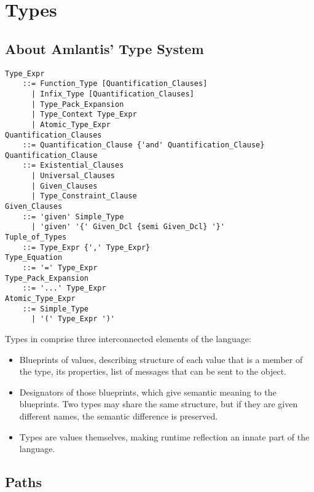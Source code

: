 
\chapter{Types}

\minitoc

\newpage

\section{About Amlantis' Type System}

\grammar\begin{lstlisting}
Type_Expr
    ::= Function_Type [Quantification_Clauses]
      | Infix_Type [Quantification_Clauses]
      | Type_Pack_Expansion
      | Type_Context Type_Expr
      | Atomic_Type_Expr
Quantification_Clauses 
    ::= Quantification_Clause {'and' Quantification_Clause}
Quantification_Clause  
    ::= Existential_Clauses
      | Universal_Clauses
      | Given_Clauses
      | Type_Constraint_Clause
Given_Clauses
    ::= 'given' Simple_Type
      | 'given' '{' Given_Dcl {semi Given_Dcl} '}'
Tuple_of_Types 
    ::= Type_Expr {',' Type_Expr}
Type_Equation 
    ::= '=' Type_Expr
Type_Pack_Expansion 
    ::= '...' Type_Expr
Atomic_Type_Expr
    ::= Simple_Type
      | '(' Type_Expr ')'
\end{lstlisting}

Types in \Aml comprise three interconnected elements of the language:
\begin{itemize}
  \item Blueprints of values, describing structure of each value that is a member of the type, its properties, list of messages that can be sent to the object. 
  \item Designators of those blueprints, which give semantic meaning to the blueprints. Two types may share the same structure, but if they are given different names, the semantic difference is preserved. 
  \item Types are values themselves, making runtime reflection an innate part of the language. 
\end{itemize}





\section{Paths}
\label{sec:type-paths}

